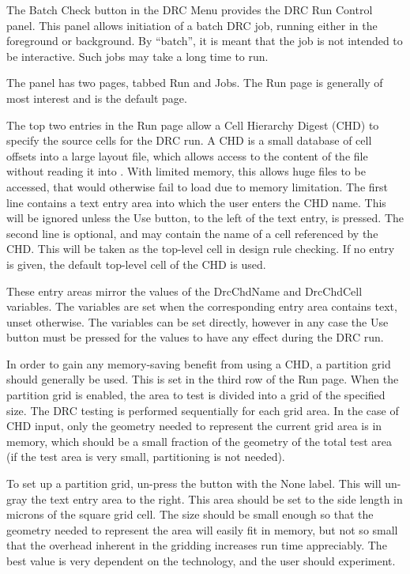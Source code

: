The {\cb Batch Check} button in the {\cb DRC Menu} provides the {\cb
DRC Run Control} panel.  This panel allows initiation of a batch DRC
job, running either in the foreground or background.  By ``batch'', it
is meant that the job is not intended to be interactive.  Such jobs
may take a long time to run.

The panel has two pages, tabbed {\cb Run} and {\cb Jobs}.  The {\cb
Run} page is generally of most interest and is the default page.

The top two entries in the {\cb Run} page allow a Cell Hierarchy
Digest (CHD) to specify the source cells for the DRC run.  A CHD is a
small database of cell offsets into a large layout file, which allows
access to the content of the file without reading it into {\Xic}. 
With limited memory, this allows huge files to be accessed, that would
otherwise fail to load due to memory limitation.  The first line
contains a text entry area into which the user enters the CHD name. 
This will be ignored unless the {\cb Use} button, to the left of the
text entry, is pressed.  The second line is optional, and may contain
the name of a cell referenced by the CHD.  This will be taken as the
top-level cell in design rule checking.  If no entry is given, the
default top-level cell of the CHD is used.

These entry areas mirror the values of the {\et DrcChdName} and {\et
DrcChdCell} variables.  The variables are set when the corresponding
entry area contains text, unset otherwise.  The variables can be set
directly, however in any case the {\cb Use} button must be pressed for
the values to have any effect during the DRC run.

In order to gain any memory-saving benefit from using a CHD, a
partition grid should generally be used.  This is set in the third row
of the {\cb Run} page.  When the partition grid is enabled, the area
to test is divided into a grid of the specified size.  The DRC testing
is performed sequentially for each grid area.  In the case of CHD
input, only the geometry needed to represent the current grid area is
in memory, which should be a small fraction of the geometry of the
total test area (if the test area is very small, partitioning is not
needed).

To set up a partition grid, un-press the button with the {\cb None}
label.  This will un-gray the text entry area to the right.  This area
should be set to the side length in microns of the square grid cell. 
The size should be small enough so that the geometry needed to
represent the area will easily fit in memory, but not so small that
the overhead inherent in the gridding increases run time appreciably. 
The best value is very dependent on the technology, and the user
should experiment.

